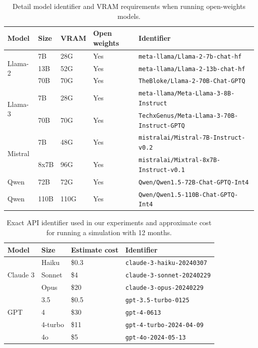\documentclass{article}
\begin{document}
\begin{table}[h]
\centering
\small
\caption{Detail model identifier and VRAM requirements when running open-weights models. }
\label{table:model_requirements_open}
\begin{tabular}
{m{}m{}m{}m{}m{}}
\toprule
 Model  & Size &  VRAM  & Open weights & Identifier \\
\midrule
\multirow[c]{3}{*}{Llama-2} & 7B & 28G & Yes & \texttt{meta-llama/Llama-2-7b-chat-hf} \\
 & 13B & 52G & Yes & \texttt{meta-llama/Llama-2-13b-chat-hf}   \\
 & 70B & 70G & Yes & \texttt{TheBloke/Llama-2-70B-Chat-GPTQ}  \\
\midrule
\multirow[c]{2}{*}{Llama-3} & 7B & 28G & Yes & \texttt{meta-llama/Meta-Llama-3-8B-Instruct} \\
 & 70B & 70G & Yes & \texttt{TechxGenus/Meta-Llama-3-70B-Instruct-GPTQ}  \\
\midrule
\multirow[c]{2}{*}{Mistral} & 7B & 48G & Yes & \texttt{mistralai/Mistral-7B-Instruct-v0.2}  \\
 & 8x7B &  96G & Yes & \texttt{mistralai/Mixtral-8x7B-Instruct-v0.1} \\
\midrule
Qwen & 72B &  72G & Yes & \texttt{Qwen/Qwen1.5-72B-Chat-GPTQ-Int4} \\
Qwen & 110B & 110G & Yes & \texttt{Qwen/Qwen1.5-110B-Chat-GPTQ-Int4} \\
\bottomrule
\end{tabular}

\end{table}


\begin{table}[h]
\centering
\caption{Exact API identifier used in our experiments and approximate cost for running a simulation with 12 months.}
\label{table:model_requirements_close}
\begin{tabular}
{m{}m{}m{}m{}}
\toprule
 Model  & Size &  Estimate \newline cost  & Identifier \\
\midrule
\multirow[c]{3}{*}{Claude 3} & Haiku & \$0.3  & \texttt{claude-3-haiku-20240307} \\
 & Sonnet & \$4 & \texttt{claude-3-sonnet-20240229}  \\
 & Opus  &  \$20 & \texttt{claude-3-opus-20240229}  \\
\midrule
\multirow[c]{3}{*}{GPT} & 3.5 & \$0.5  & \texttt{gpt-3.5-turbo-0125}  \\
 & 4  & \$30 & \texttt{gpt-4-0613} \\
 & 4-turbo  & \$11 & \texttt{gpt-4-turbo-2024-04-09} \\
 & 4o  & \$5 & \texttt{gpt-4o-2024-05-13} \\
%
%
%
%
\bottomrule
\end{tabular}

\end{table}
\end{document}
